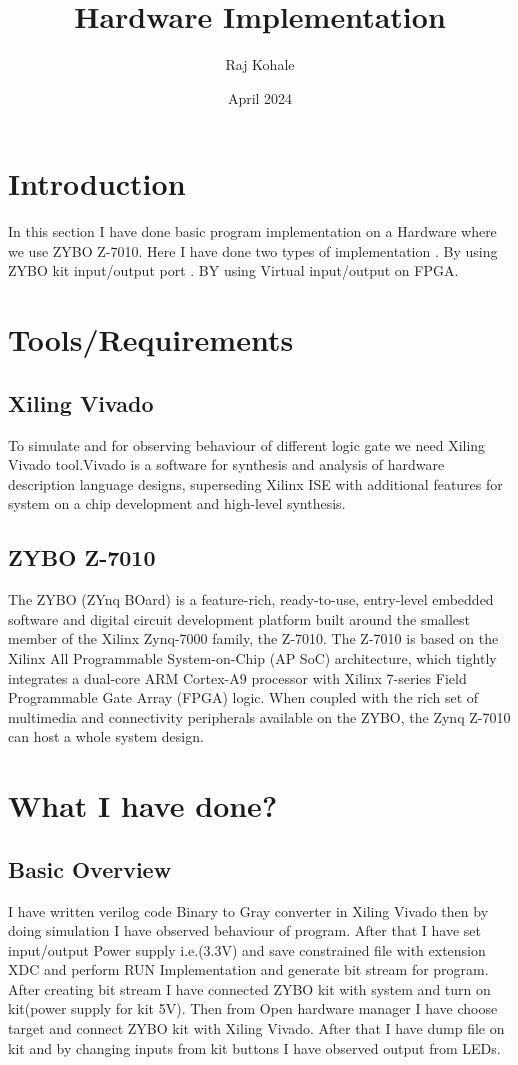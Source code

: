 \documentclass{article}
\title{\textbf{Hardware Implementation}}
\author{Raj Kohale}
\date{April 2024}
\begin{document}
\maketitle
\section{Introduction}
In this section I have done basic program implementation on a Hardware where we use ZYBO Z-7010. Here I have done two types of implementation 
. By using ZYBO kit input/output port 
. BY using Virtual input/output on FPGA.

\section{ Tools/Requirements }
\subsection{Xiling Vivado}
To simulate and for observing behaviour of different logic gate we need Xiling Vivado tool.Vivado is a software for synthesis and analysis of hardware description language designs, superseding Xilinx ISE with additional features for system on a chip development and high-level synthesis.

\subsection{ZYBO Z-7010}
The ZYBO (ZYnq BOard) is a feature-rich, ready-to-use, entry-level embedded software and digital circuit development platform built around the smallest member of the Xilinx Zynq-7000 family, the Z-7010. The Z-7010 is based on the Xilinx All Programmable System-on-Chip (AP SoC) architecture, which tightly integrates a dual-core ARM Cortex-A9 processor with Xilinx 7-series Field Programmable Gate Array (FPGA) logic. When coupled with the rich set of multimedia and connectivity peripherals available on the ZYBO, the Zynq Z-7010 can host a whole system design.
\section{What I have done?}
\subsection{Basic Overview}
I have written verilog code Binary to Gray converter in Xiling Vivado then by doing simulation I have observed behaviour of program. After that I have set input/output Power supply i.e.(3.3V) and save constrained file with extension XDC and perform RUN Implementation and generate bit stream for program.
\newline    After creating bit stream I have connected ZYBO kit with system and turn on kit(power supply for kit 5V). Then from Open hardware manager I have choose target and connect ZYBO kit with Xiling Vivado. After that I have dump file on kit and by changing inputs from kit buttons I have observed output from LEDs.
\end{document}
